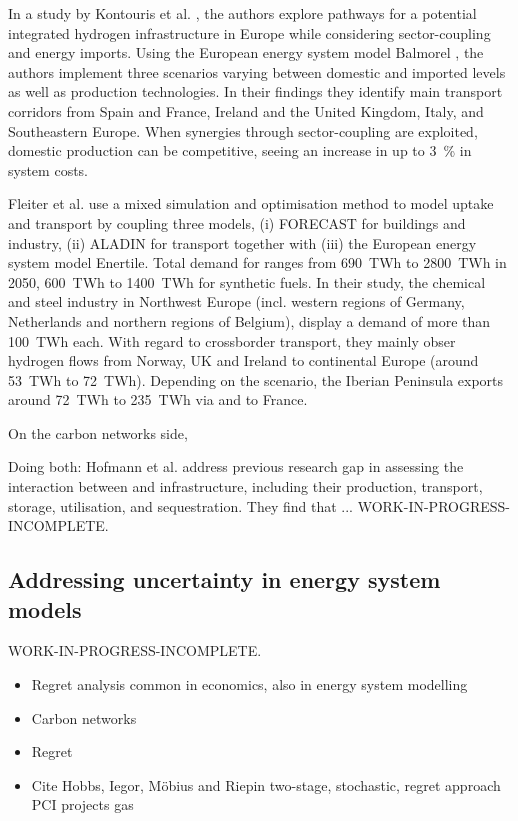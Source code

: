 \documentclass[preprint,12pt,sort&compress]{elsarticle}
\begin{document}
In a study by Kontouris et al. \cite{kountourisUnifiedEuropeanHydrogen2024}, the authors explore pathways for a potential integrated hydrogen infrastructure in Europe while considering sector-coupling and energy imports. Using the European energy system model Balmorel \cite{wieseBalmorelOpenSource2018}, the authors implement three scenarios varying between domestic and imported  levels as well as  production technologies. In their findings they identify main  transport corridors from Spain and France, Ireland and the United Kingdom, Italy, and Southeastern Europe. When synergies through sector-coupling are exploited, domestic  production can be competitive, seeing an increase in up to \SI{3}{\percent} in system costs.

Fleiter et al. \cite{fleiterHydrogenInfrastructureFuture2025} use a mixed simulation and optimisation method to model  uptake and transport by coupling three models, (i) FORECAST for buildings and industry, (ii) ALADIN for transport together with (iii) the European energy system model Enertile. Total demand for  ranges from \SI{690}{TWh} to \SI{2800}{TWh} in 2050, \SI{600}{TWh} to \SI{1400}{TWh} for synthetic fuels. In their study, the  chemical and steel industry in Northwest Europe (incl. western regions of Germany, Netherlands and northern regions of Belgium), display a demand of more than \SI{100}{TWh} each. With regard to crossborder transport, they mainly obser hydrogen flows from Norway, UK and Ireland to continental Europe (around \SI{53}{TWh} to \SI{72}{TWh}). Depending on the scenario, the Iberian Peninsula exports around \SI{72}{TWh} to \SI{235}{TWh} via and to France.

On the carbon networks side, \cite{bakkenLinearModelsOptimization2008}

Doing both:
Hofmann et al. \cite{hofmannH2CO2Network2025} address previous research gap in assessing the interaction between  and  infrastructure, including their production, transport, storage, utilisation, and sequestration. They find that ...
WORK-IN-PROGRESS-INCOMPLETE. 
\subsection{Addressing uncertainty in energy system models}
WORK-IN-PROGRESS-INCOMPLETE. 

\begin{itemize}
  \item Regret analysis common in economics, also in energy system modelling
  \item Carbon networks
  \item Regret
  \item Cite Hobbs, Iegor, Möbius and Riepin two-stage, stochastic, regret approach  \cite{mobiusRegretAnalysisInvestment2020a}
  PCI projects gas
  
\end{itemize}
\end{document}
